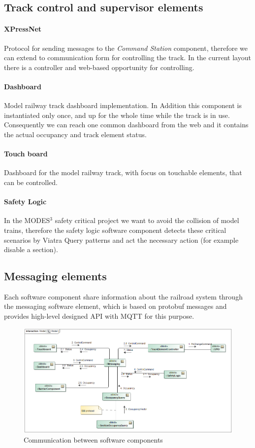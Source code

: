\subsection{Track control and supervisor elements}
\paragraph{XPressNet}
Protocol for sending messages to the \textit{Command Station} component, therefore we can extend to communication form for controlling the track. In the current layout there is a controller and web-based opportunity for controlling.
\paragraph{Dashboard}
Model railway track dashboard implementation. In Addition this component is instantiated only once, and up for the whole time while the track is in use. Consequently we can reach one common dashboard from the web and it contains the actual occupancy and track element status.
\paragraph{Touch board}
Dashboard for the model railway track, with focus on touchable elements, that can be controlled.
\paragraph{Safety Logic}
In the MODES$^3$ safety critical project we want to avoid the collision of model trains, therefore the safety logic software component detects these critical scenarios by Viatra Query \cite{Viatra} patterns and act the necessary action (for example disable a section).


\subsection{Messaging elements}
Each software component share information about the railroad system through the messaging software element, which is based on protobuf messages and provides high-level designed API with MQTT for this purpose. 
\begin{figure}[!h]
	\centering
	\includegraphics[width=150mm, keepaspectratio]{figures/modes3/CommunicationModel.png}
	\caption{Communication between software components}
	\label{fig:communicationModel}
\end{figure}

